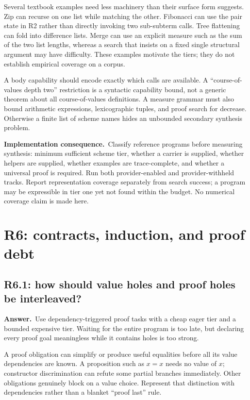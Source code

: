 \documentclass[11pt,a4paper]{article}
\theoremstyle{definition}
\theoremstyle{remark}
\newcommand{\ans}{\noindent\textbf{Answer.}\ }
\newcommand{\imp}{\par\noindent\textbf{Implementation consequence.}\ }
\begin{document}
Several textbook examples need less machinery than their surface form
suggests. Zip can recurse on one list while matching the other. Fibonacci can
use the pair state in R2 rather than directly invoking two sub-subterm calls.
Tree flattening can fold into difference lists. Merge can use an explicit
measure such as the sum of the two list lengths, whereas a search that insists
on a fixed single structural argument may have difficulty. These examples
motivate the tiers; they do not establish empirical coverage on a corpus.

A body capability should encode exactly which calls are available. A
``course-of-values depth two'' restriction is a syntactic capability bound,
not a generic theorem about all course-of-values definitions. A measure grammar
must also bound arithmetic expressions, lexicographic tuples, and proof search
for decrease. Otherwise a finite list of scheme names hides an unbounded
secondary synthesis problem.

\imp Classify reference programs before measuring synthesis: minimum sufficient
scheme tier, whether a carrier is supplied, whether helpers are supplied,
whether examples are trace-complete, and whether a universal proof is required.
Run both provider-enabled and provider-withheld tracks. Report representation
coverage separately from search success; a program may be expressible in tier
one yet not found within the budget. No numerical coverage claim is made here.

\section{R6: contracts, induction, and proof debt}\label{sec:r6}

\subsection{R6.1: how should value holes and proof holes be interleaved?}\label{q:R6.1}
\ans Use dependency-triggered proof tasks with a cheap eager tier and a bounded
expensive tier. Waiting for the entire program is too late, but declaring every
proof goal meaningless while it contains holes is too strong.

A proof obligation can simplify or produce useful equalities before all its
value dependencies are known. A proposition such as $x=x$ needs no value of
$x$; constructor discrimination can refute some partial branches immediately.
Other obligations genuinely block on a value choice. Represent that distinction
with dependencies rather than a blanket ``proof last'' rule.
\end{document}
